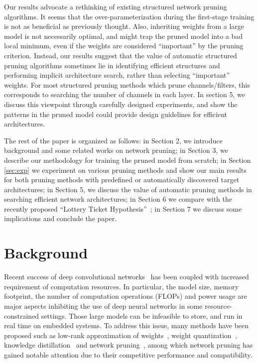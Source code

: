 Our results advocate a rethinking of existing structured network pruning algorithms. It seems that the over-parameterization during the first-stage training is not as beneficial as previously thought. Also, inheriting weights from a large model is not necessarily optimal, and might trap the pruned model into a bad local minimum, even if the weights are considered ``important'' by the pruning criterion. Instead, our results suggest that the value of automatic structured pruning algorithms sometimes lie in identifying efficient structures and performing implicit architecture search, rather than selecting ``important'' weights. For most structured pruning methods which prune channels/filters, this corresponds to searching the number of channels in each layer. In section 5, we discuss this viewpoint through carefully designed experiments, and show the patterns in the pruned model could provide design guidelines for efficient architectures.

The rest of the paper is organized as follows: in Section 2, we introduce background and some related works on network pruning; in Section 3, we describe our methodology for training the pruned model from scratch; in Section \ref{sec:exp} we experiment on various pruning methods and show our main results for both pruning methods with predefined or automatically discovered target architectures; in Section 5, we discuss the value of automatic pruning methods in searching efficient network architectures; in Section 6 we compare with the recently proposed ``Lottery Ticket Hypothesis''~\cite{lottery}; in Section 7 we discuss some implications and conclude the paper.


\section{Background}
Recent success of deep convolutional networks~\cite{lecun1998gradient, imagenet,rcnn,fcn,resnet,He2017} has been coupled with increased requirement of computation resources. In particular, the model size, memory footprint, the number of computation operations (FLOPs) and power usage are major aspects inhibiting the use of deep neural networks in some resource-constrained settings. Those large models can be infeasible to store, and run in real time on embedded systems. To address this issue, many methods have been proposed such as low-rank approximation of weights~\cite{lowrank1, lowrank2}, weight quantization~\cite{binarynet, xnornet}, knowledge distillation~\cite{hinton2015distilling, fitnet} and network pruning~\cite{han2015learning,li2016pruning}, among which network pruning has gained notable attention due to their competitive performance and compatibility.


